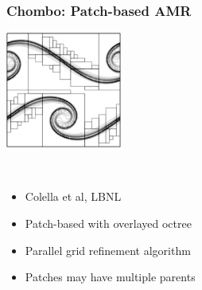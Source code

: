 \begin{frame}[fragile] \frametitle{Chombo: Patch-based AMR}
\begin{minipage}{1.5in}
\centerline{\includegraphics[width=1.5in]{chombo.png}}
\end{minipage} \ 
\begin{minipage}{2.5in}
\begin{itemize}
\item Colella et al, LBNL
\item Patch-based with overlayed octree
\item Parallel grid refinement algorithm
\item Patches may have multiple parents
\end{itemize}
\end{minipage}
\end{frame}
